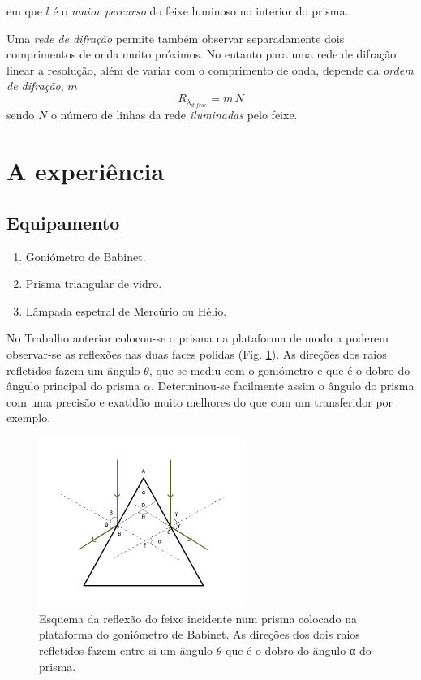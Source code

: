 \documentclass[a4paper,12pt]{article}  %
\begin{document}
em que $l$ é o \emph{maior percurso} do feixe luminoso no interior do prisma.

Uma \emph{rede de difração}
permite também observar separadamente dois comprimentos de onda muito próximos.
No entanto para uma rede de difração linear a resolução, além de variar com o comprimento de onda, depende da \emph{ordem de difração}, $m$
 \begin{equation}
	\label{eq:resoludrifa}
	R_{\lambda_{difrac}} = m\,N 
\end{equation}
sendo $N$  o número de linhas da rede \emph{iluminadas} pelo feixe.


\section{\sf A experiência}
\subsection{\sf Equipamento}

\begin{enumerate}
\item Goniómetro de Babinet.
\item Prisma triangular de vidro.
\item Lâmpada espetral de Mercúrio ou Hélio.
\end{enumerate}

No Trabalho anterior colocou-se o prisma na plataforma de modo a poderem observar-se as reflexões nas duas faces polidas (Fig. \ref{fig:angulo}). As direções dos raios refletidos fazem um ângulo $\theta$, que se mediu com o goniómetro e que é o dobro do ângulo principal do prisma $\alpha$.  Determinou-se facilmente assim o ângulo do prisma com uma precisão e exatidão muito melhores do que com um transferidor por exemplo.

\begin{figure}[tb]  \centering 
	\includegraphics[width=0.6\textwidth]{angulo}
	\caption{Esquema da reflexão do feixe incidente num prisma colocado na plataforma do goniómetro de Babinet. As direções dos dois raios refletidos fazem entre si um ângulo $\theta$ que é o dobro do ângulo α do prisma. \label{fig:angulo}} 
\end{figure}
\end{document}
